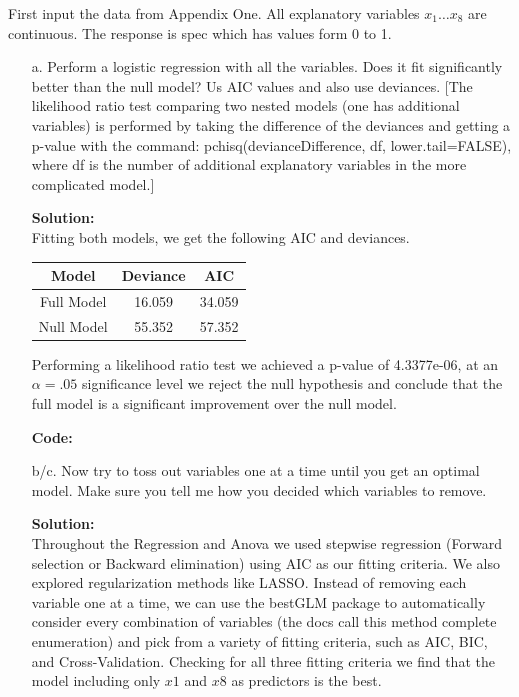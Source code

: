 \documentclass[12pt]{article}
\makeatletter
\theoremstyle{homework}
\newenvironment{exercise}[1]
{\def\@currentlabel{#1}\exercisecore}
{\endexercisecore}
\newcommand{\localhead}[1]{\par\smallskip\noindent\textbf{#1}\nobreak\\}%
\newcommand\solution{\localhead{Solution:}}
\makeatother
\begin{document}
\begin{exercise}{1} First input the data from Appendix One. All explanatory 
variables $x_1 \dots x_8$ are continuous. The response is spec which has values form 0 to 1. 

\begin{enumerate}
  \item[a.] Perform a logistic regression with all the variables. Does it fit significantly better than the null model? Us AIC values and also use 
  deviances. [The likelihood ratio test comparing two nested models (one has additional variables) is performed by
  taking the difference of the deviances and getting a p-value with the command: pchisq(devianceDifference, df, lower.tail=FALSE), where df
  is the number of additional explanatory variables in the more complicated model.]\\
  \solution Fitting both models, we get the following AIC and deviances. 
  \begin{center}
  \begin{tabular}{|c||c|c| }
    \hline
    Model & Deviance &  AIC \\
    \hline 
    \hline
    Full Model& 16.059 & 34.059 \\
    Null Model& 55.352 & 57.352 \\
    \hline
   \end{tabular}
  \end{center}
  Performing a likelihood ratio test we achieved a p-value of 4.3377e-06, at an $\alpha = .05$ significance level we reject the null hypothesis and conclude that 
  the full model is a significant improvement over the null model. 

      \textbf{Code:}
      \begin{center}
      
      \end{center}
  \vspace{.15in}





  \item[b/c.] Now try to toss out variables one at a time until you get an optimal model. Make sure you tell me how you decided which variables to
  remove.\\
  \solution Throughout the Regression and Anova we used stepwise regression (Forward selection or Backward elimination) using AIC as our fitting criteria. We also explored regularization methods like LASSO. 
  Instead of removing each variable one at a time, we can use the bestGLM package to automatically consider every combination of variables (the docs call this method complete enumeration) 
  and pick from a variety of fitting criteria, such as AIC, BIC, and Cross-Validation. Checking for all three fitting criteria we find that the model including only $x1$ and $x8$ as predictors is the best.\\ 
  

\end{enumerate}
\end{exercise}
\end{document}
